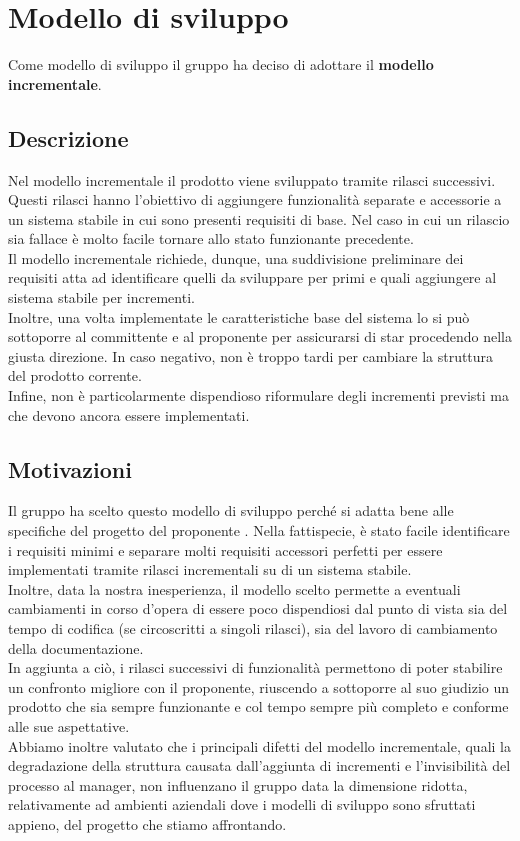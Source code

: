 \section{Modello di sviluppo}
Come modello di sviluppo il gruppo \Gruppo{} ha deciso di adottare il \textbf{modello incrementale}.
\subsection{Descrizione}
Nel modello incrementale il prodotto viene sviluppato tramite rilasci successivi. Questi rilasci hanno l'obiettivo di aggiungere funzionalità separate e accessorie a un sistema stabile in cui sono presenti requisiti di base.
Nel caso in cui un rilascio sia fallace è molto facile tornare allo stato funzionante precedente.\\
Il modello incrementale richiede, dunque, una suddivisione preliminare dei requisiti atta ad identificare quelli da sviluppare per primi e quali aggiungere al sistema stabile per incrementi. \\
Inoltre, una volta implementate le caratteristiche base del sistema lo si può sottoporre al committente e al proponente per assicurarsi di star procedendo nella giusta direzione.
In caso negativo, non è troppo tardi per cambiare la struttura del prodotto corrente. \\
Infine, non è particolarmente dispendioso riformulare degli incrementi previsti ma che devono ancora essere implementati. 

\subsection{Motivazioni}
Il gruppo ha scelto questo modello di sviluppo perché si adatta bene alle specifiche del progetto \NomeProgetto{} del proponente \Proponente{}.
Nella fattispecie, è stato facile identificare i requisiti minimi e separare molti requisiti accessori perfetti per essere implementati tramite rilasci incrementali su di un sistema stabile.\\
Inoltre, data la nostra inesperienza, il modello scelto permette a eventuali cambiamenti in corso d'opera di essere poco dispendiosi dal punto di vista sia del tempo di codifica (se circoscritti a singoli rilasci), sia del lavoro di cambiamento della documentazione. \\
In aggiunta a ciò, i rilasci successivi di funzionalità permettono di poter stabilire un confronto migliore con il proponente, riuscendo a sottoporre al suo giudizio un prodotto che sia sempre funzionante e col tempo sempre più completo e conforme alle sue aspettative. \\
Abbiamo inoltre valutato che i principali difetti del modello incrementale, quali la degradazione della struttura causata dall'aggiunta di incrementi e l'invisibilità del processo al manager, 
non influenzano il gruppo data la dimensione ridotta, relativamente ad ambienti aziendali dove i modelli di sviluppo sono sfruttati appieno, del progetto che stiamo affrontando.



